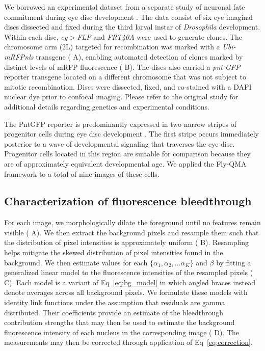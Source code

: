 \documentclass[10pt,letterpaper]{article}
\begin{document}
We borrowed an experimental dataset from a separate study of neuronal fate commitment during eye disc development \cite{Bernasek2018}. The data consist of six eye imaginal discs dissected and fixed during the third larval instar of \textit{Drosophila} development. Within each disc, \textit{ey$>$FLP} and \textit{FRT40A} were used to generate clones. The chromosome arm (2L) targeted for recombination was marked with a \textit{Ubi-mRFPnls} transgene (  A), enabling automated detection of clones marked by distinct levels of mRFP fluorescence (  B). The discs also carried a \textit{pnt-GFP} reporter transgene located on a different chromosome that was not subject to mitotic recombination. Discs were dissected, fixed, and co-stained with a DAPI nuclear dye prior to confocal imaging. Please refer to the original study for additional details regarding genetics and experimental conditions. 

The PntGFP reporter is predominantly expressed in two narrow stripes of progenitor cells during eye disc development \cite{Bernasek2018}. The first stripe occurs immediately posterior to a wave of developmental signaling that traverses the eye disc. Progenitor cells located in this region are suitable for comparison because they are of approximately equivalent developmental age. We applied the Fly-QMA framework to a total of nine images of these cells.


\subsection*{Characterization of fluorescence bleedthrough}

For each image, we morphologically dilate the foreground until no features remain visible (  A). We then extract the background pixels and resample them such that the distribution of pixel intensities is approximately uniform (  B). Resampling helps mitigate the skewed distribution of pixel intensities found in the background. We then estimate values for each $\{\alpha_1, \alpha_2, \ldots \alpha_K\}$ and $\beta$ by fitting a generalized linear model to the fluorescence intensities of the resampled pixels ( C). Each model is a variant of Eq~\ref{eq:bg_model} in which angled braces instead denote averages across all background pixels. We formulate these models with identity link functions under the assumption that residuals are gamma distributed. Their coefficients provide an estimate of the bleedthrough contribution strengths that may then be used to estimate the background fluorescence intensity of each nucleus in the corresponding image ( D). The measurements may then be corrected through application of Eq~\ref{eq:correction}. 
\end{document}
